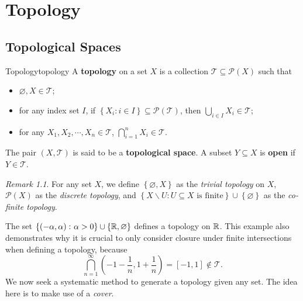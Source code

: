 \documentclass[math, code]{amznotes}
\theoremstyle{remark}
\newtheorem*{remark}{Remark}
\begin{document}
\tableofcontents
\chapter{Topology}
\section{Topological Spaces}
\begin{dfnbox}{Topology}{topology}
    A {\color{red} \textbf{topology}} on a set $X$ is a collection $\mathcal{T} \subseteq \mathcal{P}\left(X\right)$ such that 
    \begin{itemize}
        \item $\varnothing, X \in \mathcal{T}$;
        \item for any index set $I$, if $\left\{X_i \colon i \in I\right\} \subseteq \mathcal{P}\left(\mathcal{T}\right)$, then $\bigcup_{i \in I}X_i \in \mathcal{T}$;
        \item for any $X_1, X_2, \cdots, X_n \in \mathcal{T}$, $\bigcap_{i = 1}^nX_i \in \mathcal{T}$.
    \end{itemize}
    The pair $\left(X, \mathcal{T}\right)$ is said to be a {\color{red} \textbf{topological space}}. A subset $Y \subseteq X$ is {\color{red} \textbf{open}} if $Y \in \mathcal{T}$.
\end{dfnbox}
\begin{notebox}
    \begin{remark}
        For any set $X$, we define $\left\{\varnothing, X\right\}$ as the \textit{trivial topology} on $X$, $\mathcal{P}\left(X\right)$ as the \textit{discrete topology}, and $\left\{X \backslash U \colon U \subseteq X \textrm{ is finite}\right\} \cup \left\{\varnothing\right\}$ as the \textit{co-finite topology}.
    \end{remark}
\end{notebox}
The set $\left\{\left(-\alpha, \alpha\right) \colon \alpha > 0\right\} \cup \left\{\mathbb{R}, \varnothing\right\}$ defines a topology on $\mathbb{R}$. This example also demonstrates why it is crucial to only consider closure under finite intersections when defining a topology, because
\begin{equation*}
    \bigcap_{n = 1}^{\infty}\left(-1 - \frac{1}{n}, 1 + \frac{1}{n}\right) = [-1, 1] \notin \mathcal{T}.
\end{equation*}
We now seek a systematic method to generate a topology given any set. The idea here is to make use of a \textit{cover}.
\end{document}

